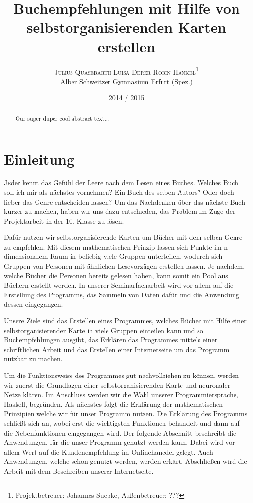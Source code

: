 \documentclass[twoside,a4paper]{article}
\title{\vspace{-15mm}\fontsize{24pt}{10pt}\selectfont\bfseries{}Buchempfehlungen mit Hilfe von selbstorganisierenden Karten erstellen}
\author{\large\textsc{Julius Quasebarth \quad Luisa Derer \quad Robin Hankel}\thanks{Projektbetreuer: Johannes Suepke, Außenbetreuer: ???}\\[2mm]\normalsize Alber Schweitzer Gymnasium Erfurt (Spez.)\\\vspace{-5mm}}
\date{2014 / 2015}
\newcommand{\commonlettrine}[1]{\lettrine[nindent=0em,lines=2]{#1}}
\begin{document}
\maketitle

\thispagestyle{fancy}


\begin{otherlanguage}{english}
\begin{abstract}
\noindent
Our super duper cool abstract text...
\end{abstract}
\end{otherlanguage}

\tableofcontents

\section{Einleitung}

\commonlettrine{J}eder kennt das Gefühl der Leere nach dem Lesen eines Buches. Welches Buch soll ich mir als nächstes vornehmen? Ein Buch des selben Autors? Oder doch lieber das Genre entscheiden lassen?
Um das Nachdenken über das nächste Buch kürzer zu machen, haben wir uns dazu entschieden, das Problem im Zuge der Projektarbeit in der 10. Klasse zu lösen.

Dafür nutzen wir selbstorganisierende Karten um Bücher mit dem selben Genre zu empfehlen. Mit diesem mathematischen Prinzip lassen sich Punkte im n-dimensionalem Raum in beliebig viele Gruppen unterteilen, wodurch sich Gruppen von Personen mit ähnlichen Lesevorzügen erstellen lassen. Je nachdem, welche Bücher die Personen bereits gelesen haben, kann somit ein \glqq{}Pool\grqq{} aus Büchern erstellt werden. In unserer Seminarfacharbeit wird vor allem auf die Erstellung des Programms, das Sammeln von Daten dafür und die Anwendung dessen eingegangen.
 
Unsere Ziele sind das Erstellen eines Programmes, welches Bücher mit Hilfe einer selbstorganisierender Karte in viele Gruppen einteilen kann und so Buchempfehlungen ausgibt, das Erklären das Programmes mittels einer schriftlichen Arbeit und das Erstellen einer Internetseite um das Programm nutzbar zu machen.

Um die Funktionsweise des Programmes gut nachvollziehen zu können, werden wir zuerst die Grundlagen einer selbstorganisierenden Karte und neuronaler Netze klären. Im Anschluss werden wir die Wahl unserer Programmiersprache, Haskell, begründen. Als nächstes folgt die Erklärung der mathematischen Prinzipien welche wir für unser Programm nutzen. Die Erklärung des Programms schließt sich an, wobei erst die wichtigsten Funktionen behandelt und dann auf die Nebenfunktionen eingegangen wird. Der folgende Abschnitt beschreibt die Anwendungen, für die unser Programm genutzt werden kann. Dabei wird vor allem Wert auf die Kundenempfehlung im Onlinehanedel gelegt. Auch Anwendungen, welche schon genutzt werden, werden erkärt. Abschließen wird die Arbeit mit dem Beschreiben unserer Internetseite.
\end{document}
